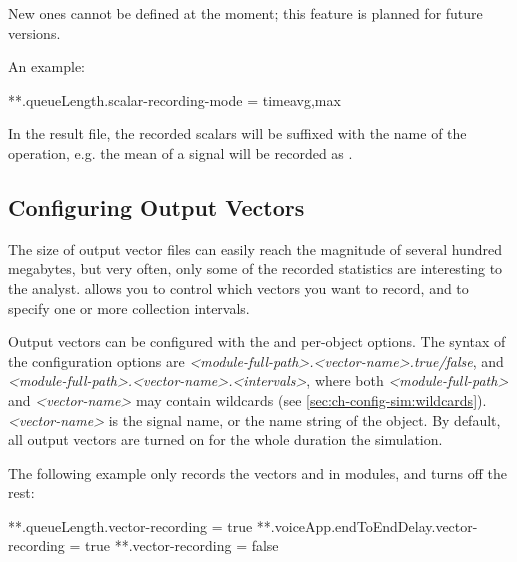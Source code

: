 New ones cannot be defined at the moment; this feature is planned for future versions.

An example:

\begin{inifile}
**.queueLength.scalar-recording-mode = timeavg,max
\end{inifile}

In the result file, the recorded scalars will be suffixed with the name
of the operation, e.g. the mean of a  signal will
be recorded as .



\subsection{Configuring Output Vectors}
\label{sec:ch-config-sim:outvectors}

The size of output vector files can easily reach the magnitude of several
hundred megabytes, but very often, only some of the recorded statistics are
interesting to the analyst. {\opp} allows you to control which vectors you
want to record, and to specify one or more collection intervals.

Output vectors can be configured with the  and
 per-object options. The syntax of the
configuration options are
\textit{<module-full-path>.<vector-name>.}\textit{true/false},
and \textit{<module-full-path>.<vector-name>.}\textit{<intervals>},
where both \textit{<module-full-path>} and \textit{<vector-name>} may
contain wildcards (see \ref{sec:ch-config-sim:wildcards}).
\textit{<vector-name>} is the signal name, or the name string of the
 object. By default, all output vectors are turned
on for the whole duration the simulation.

The following example only records the  vectors and
 in  modules, and turns off the rest:

\begin{inifile}
**.queueLength.vector-recording = true
**.voiceApp.endToEndDelay.vector-recording = true
**.vector-recording = false
\end{inifile}

